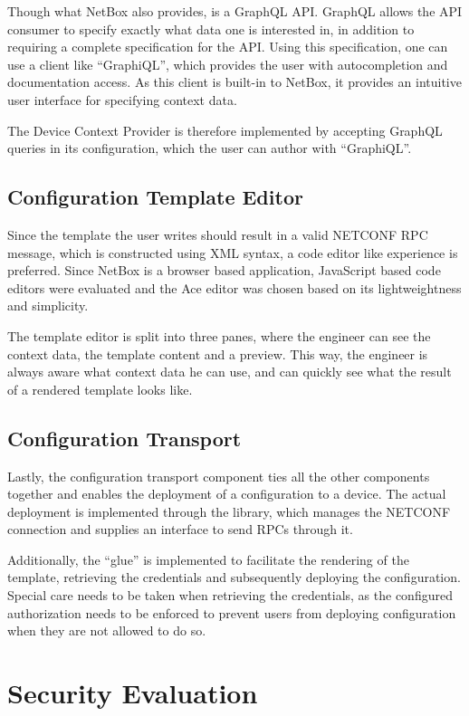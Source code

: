 Though what NetBox also provides, is a GraphQL API. GraphQL allows
the API consumer to specify exactly what data one is interested in,
in addition to requiring a complete specification for the API.
Using this specification, one can use a client like ``GraphiQL'',
which provides the user with autocompletion and documentation
access. As this client is built-in to NetBox, it provides an
intuitive user interface for specifying context data.

The Device Context Provider is therefore implemented by accepting
GraphQL queries in its configuration, which the user can author
with ``GraphiQL''.

\subsection{Configuration Template Editor}

Since the template the user writes should result in a valid NETCONF RPC
message, which is constructed using XML syntax, a code editor like experience
is preferred. Since NetBox is a browser based application, JavaScript based
code editors were evaluated and the Ace editor was chosen based on its
lightweightness and simplicity.

The template editor is split into three panes, where the engineer can see
the context data, the template content and a preview. This way, the engineer
is always aware what context data he can use, and can quickly see what the result
of a rendered template looks like.

\subsection{Configuration Transport}

Lastly, the configuration transport component ties all the other components
together and enables the deployment of a configuration to a device.
The actual deployment is implemented through the  library,
which manages the NETCONF connection and supplies an interface to send
RPCs through it.

Additionally, the ``glue'' is implemented to facilitate the rendering of
the template, retrieving the credentials and subsequently deploying the
configuration.
Special care needs to be taken when retrieving the credentials, as the
configured authorization needs to be enforced to prevent users from
deploying configuration when they are not allowed to do so.


\section{\label{eval-security}Security Evaluation}

